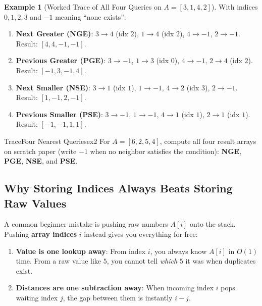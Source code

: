 \documentclass[11pt,a4paper]{article}
\theoremstyle{definition}
\newtheorem{example}{Example}[section]
\begin{document}
\begin{example}[Worked Trace of All Four Queries on $A = {[3, 1, 4, 2]}$]
With indices $0, 1, 2, 3$ and $-1$ meaning ``none exists'':
\begin{enumerate}
    \item \textbf{Next Greater (NGE)}: $3 \to 4$ (idx $2$), $1 \to 4$ (idx $2$), $4 \to -1$, $2 \to -1$. Result: $[4, 4, -1, -1]$.
    \item \textbf{Previous Greater (PGE)}: $3 \to -1$, $1 \to 3$ (idx $0$), $4 \to -1$, $2 \to 4$ (idx $2$). Result: $[-1, 3, -1, 4]$.
    \item \textbf{Next Smaller (NSE)}: $3 \to 1$ (idx $1$), $1 \to -1$, $4 \to 2$ (idx $3$), $2 \to -1$. Result: $[1, -1, 2, -1]$.
    \item \textbf{Previous Smaller (PSE)}: $3 \to -1$, $1 \to -1$, $4 \to 1$ (idx $1$), $2 \to 1$ (idx $1$). Result: $[-1, -1, 1, 1]$.
\end{enumerate}
\end{example}

\begin{tryitbox}{Trace}{Four Nearest Queries}{ex2}
For $A = [6, 2, 5, 4]$, compute all four result arrays on scratch paper (write $-1$ when no neighbor satisfies the condition): \textbf{NGE}, \textbf{PGE}, \textbf{NSE}, and \textbf{PSE}.
\end{tryitbox}

\subsection{Why Storing Indices Always Beats Storing Raw Values}

A common beginner mistake is pushing raw numbers $A[i]$ onto the stack. Pushing \textbf{array indices} $i$ instead gives you everything for free:
\begin{enumerate}
    \item \textbf{Value is one lookup away}: From index $i$, you always know $A[i]$ in $O(1)$ time. From a raw value like $5$, you cannot tell \emph{which} $5$ it was when duplicates exist.
    \item \textbf{Distances are one subtraction away}: When incoming index $i$ pops waiting index $j$, the gap between them is instantly $i - j$.
\end{enumerate}
\end{document}
